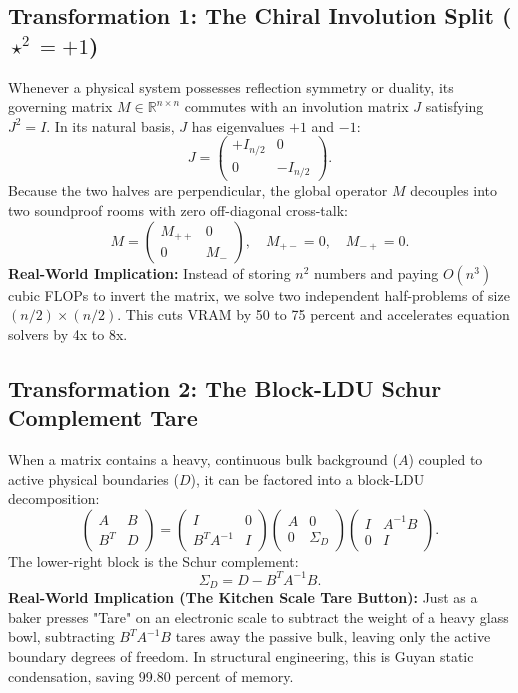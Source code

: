 \documentclass[11pt,a4paper]{article}
\begin{document}
\subsection{Transformation 1: The Chiral Involution Split ($\star^2 = +1$)}
Whenever a physical system possesses reflection symmetry or duality, its governing matrix $M \in \mathbb{R}^{n \times n}$ commutes with an involution matrix $J$ satisfying $J^2 = I$. In its natural basis, $J$ has eigenvalues $+1$ and $-1$:
\begin{equation}
J = \begin{pmatrix} +I_{n/2} & 0 \\ 0 & -I_{n/2} \end{pmatrix}.
\end{equation}
Because the two halves are perpendicular, the global operator $M$ decouples into two soundproof rooms with zero off-diagonal cross-talk:
\begin{equation}
M = \begin{pmatrix} M_{++} & 0 \\ 0 & M_{ - } \end{pmatrix}, \quad M_{+-} = 0, \quad M_{-+} = 0.
\end{equation}
\textbf{Real-World Implication:} Instead of storing $n^2$ numbers and paying $O(n^3)$ cubic FLOPs to invert the matrix, we solve two independent half-problems of size $(n/2) \times (n/2)$. This cuts VRAM by 50 to 75 percent and accelerates equation solvers by 4x to 8x.

\subsection{Transformation 2: The Block-LDU Schur Complement Tare}
When a matrix contains a heavy, continuous bulk background ($A$) coupled to active physical boundaries ($D$), it can be factored into a block-LDU decomposition:
\begin{equation}
\begin{pmatrix} A & B \\ B^T & D \end{pmatrix} = \begin{pmatrix} I & 0 \\ B^T A^{-1} & I \end{pmatrix} \begin{pmatrix} A & 0 \\ 0 & \Sigma_D \end{pmatrix} \begin{pmatrix} I & A^{-1} B \\ 0 & I \end{pmatrix}.
\end{equation}
The lower-right block is the Schur complement:
\begin{equation}
\Sigma_D = D - B^T A^{-1} B.
\end{equation}
\textbf{Real-World Implication (The Kitchen Scale Tare Button):} Just as a baker presses "Tare" on an electronic scale to subtract the weight of a heavy glass bowl, subtracting $B^T A^{-1} B$ tares away the passive bulk, leaving only the active boundary degrees of freedom. In structural engineering, this is Guyan static condensation, saving 99.80 percent of memory.
\end{document}
